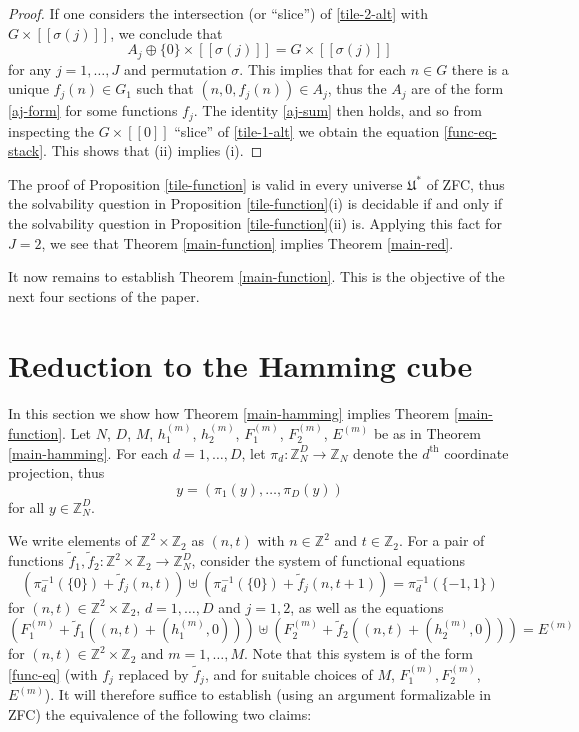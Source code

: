 \documentclass[reqno,a4paper,12pt]{amsart}
\numberwithin{equation}{section}
\numberwithin{figure}{section}
\def\Z{\mathbb{Z}}
\newcommand{\Universe}{{\mathfrak{U}}}
\theoremstyle{plain}
\theoremstyle{definition}
\begin{document}
\begin{proof}
If one considers the intersection (or ``slice'') of \eqref{tile-2-alt} with $G \times [[\sigma(j)]]$, we conclude that
$$ A_j \oplus \{0\} \times [[\sigma(j)]] = G \times [[ \sigma(j) ]]$$
for any $j=1,\dots,J$ and permutation $\sigma$.  This implies that for each $n \in G$ there is a unique $f_j(n) \in G_1$ such that $(n,0,f_j(n)) \in A_j$, thus the $A_j$ are of the form \eqref{aj-form} for some functions $f_j$.  The identity \eqref{aj-sum} then holds, and so from inspecting the $G \times [[0]]$ ``slice'' of \eqref{tile-1-alt} we obtain the equation \eqref{func-eq-stack}.  This shows that (ii) implies (i).
\end{proof}

The proof of Proposition \ref{tile-function} is valid in every universe $\Universe^*$ of ZFC, thus the solvability question in Proposition \ref{tile-function}(i) is decidable if and only if the solvability question in Proposition \ref{tile-function}(ii) is.  Applying this fact for $J=2$, we see that  Theorem \ref{main-function} implies Theorem \ref{main-red}.

It now remains to establish Theorem \ref{main-function}.  This is the objective of the next four sections of the paper.

\section{Reduction to the Hamming cube}\label{hamming-sec}

In this section we show how Theorem \ref{main-hamming} implies Theorem \ref{main-function}. Let $N$, $D$, $M$, $h_1^{(m)}$, $h_2^{(m)}$, $F_1^{(m)}$, $F_2^{(m)}$, $E^{(m)}$ be as in Theorem \ref{main-hamming}.  For each $d=1,\dots,D$, let $\pi_d \colon \Z_N^D \to \Z_N$ denote the $d^{\mathrm{th}}$ coordinate projection, thus
\begin{equation}\label{coord}
y = (\pi_1(y),\dots,\pi_D(y))
\end{equation}
for all $y \in \Z_N^D$.

We write elements of $\Z^2 \times \Z_2$ as $(n,t)$ with $n \in \Z^2$ and $t \in \Z_2$.  For a pair of functions $\tilde f_1,\tilde f_2 \colon \Z^2 \times \Z_2 \to \Z_N^D$, consider the system of functional equations
\begin{equation}\label{sys-1}
\left(\pi_d^{-1}(\{0\}) + \tilde f_j(n,t)\right) \uplus 
\left(\pi_d^{-1}(\{0\}) + \tilde f_j(n,t+1)\right) = \pi_d^{-1}(\{-1,1\}) 
\end{equation}
for $(n,t) \in \Z^2 \times \Z_2$, $d=1,\dots,D$ and $j=1,2$, as well as the equations
\begin{equation}\label{sys-2}
\left(F_1^{(m)} + \tilde f_1((n,t)+(h_1^{(m)},0))\right) \uplus
\left(F_2^{(m)} + \tilde f_2((n,t)+(h_2^{(m)},0))\right) = E^{(m)}
\end{equation}
for $(n,t) \in \Z^2 \times \Z_2$ and $m=1,\dots,M$.  Note that this system is of the form \eqref{func-eq} (with $f_j$ replaced by $\tilde f_j$, and for suitable choices of $M$, $F_1^{(m)}, F_2^{(m)}$, $E^{(m)}$).  It will therefore suffice to establish (using an argument formalizable in ZFC) the equivalence of the following two claims:
\end{document}
